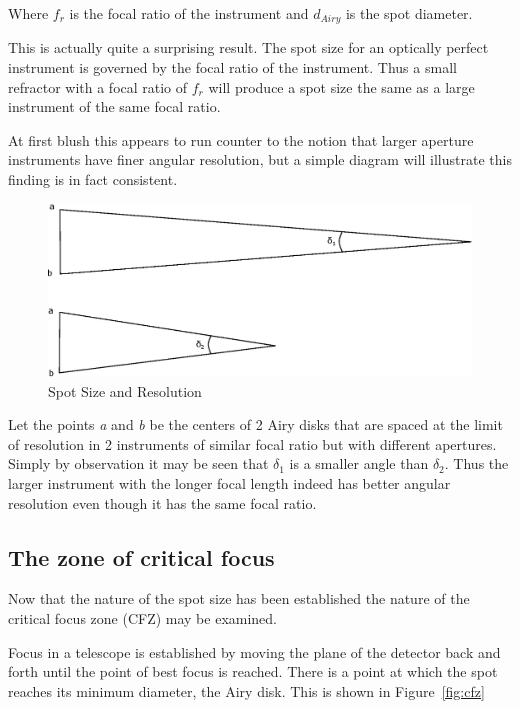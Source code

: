 \documentclass[11pt]{article}
\begin{document}
\large
Where $f_{r}$ is the focal ratio of the instrument and $d_{Airy}$ is the spot diameter.

This is actually quite a surprising result.  The spot size for an optically perfect instrument is governed by the focal ratio of the instrument.  Thus a small refractor with a focal ratio of $f_{r}$ will produce a spot size the same as a large instrument of the same focal ratio.

At first blush this appears to run counter to the notion that larger aperture instruments have finer angular resolution, but a simple diagram will illustrate this finding is in fact consistent.

\begin{figure}[htb]
	\begin{center}
		\includegraphics[scale=0.7]{./images/focal-ratio-resolution.eps}
		\caption{Spot Size and Resolution}
		\label{fig:spot_resolution}
	\end{center}
\end{figure}


Let the points {\em a} and {\em b} be the centers of 2 Airy disks that are spaced at the limit of resolution in 2 instruments of similar focal ratio but with different apertures.  Simply by observation it may be seen that $\delta_{1}$ is a smaller angle than $\delta_{2}$.  Thus the larger instrument with the longer focal length indeed has better angular resolution even though it has the same focal ratio.

\subsection{The zone of critical focus}

Now that the nature of the spot size has been established the nature of the critical focus zone (CFZ) may be examined.  

Focus in a telescope is established by moving the plane of the detector back and forth until the point of best focus is reached.  There is a point at which the spot reaches its minimum diameter, the Airy disk.  This is shown in Figure~\ref{fig:cfz}
\end{document}
